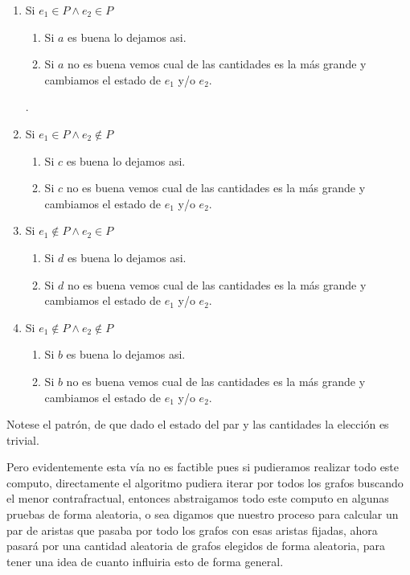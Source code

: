\documentclass[11pt,letterpaper]{report} \usepackage[utf8]{inputenc} \usepackage[spanish]{babel}
\begin{document}
\begin{enumerate}
    \item Si $e_1 \in P \wedge e_2 \in P$ 
    \begin{enumerate}
        \item Si $a$ es buena lo dejamos asi.
        \item Si $a$ no es buena vemos cual de las cantidades es la m\'as grande y cambiamos el estado de $e_1$ y/o $e_2$.
    \end{enumerate}.

    \item Si $e_1 \in P \wedge  e_2 \notin P$ 
    \begin{enumerate}
        \item Si $c$ es buena lo dejamos asi.
        \item Si $c$ no es buena vemos cual de las cantidades es la m\'as grande y cambiamos el estado de $e_1$ y/o $e_2$.
    \end{enumerate}

    \item Si $e_1 \notin P \wedge  e_2 \in P$
    \begin{enumerate}
        \item Si $d$ es buena lo dejamos asi.
        \item Si $d$ no es buena vemos cual de las cantidades es la m\'as grande y cambiamos el estado de $e_1$ y/o $e_2$.
    \end{enumerate}
 

    \item Si $e_1 \notin P \wedge  e_2 \notin P$
    \begin{enumerate}
        \item Si $b$ es buena lo dejamos asi.
        \item Si $b$ no es buena vemos cual de las cantidades es la m\'as grande y cambiamos el estado de $e_1$ y/o $e_2$.
    \end{enumerate}
 
\end{enumerate} 

Notese el patr\'on, de que dado el estado del par y las cantidades la elecci\'on es trivial.

Pero evidentemente esta v\'ia no es factible pues si pudieramos realizar todo este computo, directamente el algoritmo pudiera iterar por todos los grafos buscando el menor contrafractual, entonces abstraigamos todo este computo en algunas pruebas de forma aleatoria, o sea digamos que nuestro proceso para calcular un par de aristas que pasaba por todo los grafos con esas aristas fijadas, ahora pasar\'a por una cantidad aleatoria de grafos elegidos de forma aleatoria, para tener una idea de cuanto influiria esto de forma general. 



\end{document}
